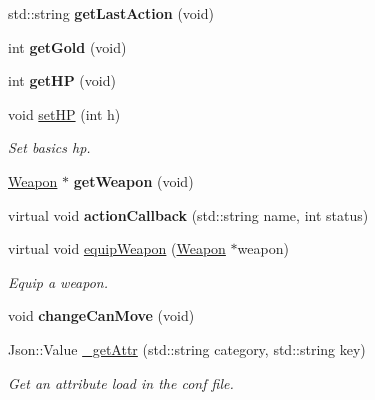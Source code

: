 \begin{DoxyCompactItemize}
\item 
\hypertarget{class_characters_a0df57bdee9ddc5e4e18954b8b30b1331}{std\+::string {\bfseries get\+Last\+Action} (void)}\label{class_characters_a0df57bdee9ddc5e4e18954b8b30b1331}

\item 
\hypertarget{class_characters_a76b0e62a2f7c10e71682196db0ee0056}{int {\bfseries get\+Gold} (void)}\label{class_characters_a76b0e62a2f7c10e71682196db0ee0056}

\item 
\hypertarget{class_characters_a136d6ba8b4bd401fda19b14b089a107f}{int {\bfseries get\+H\+P} (void)}\label{class_characters_a136d6ba8b4bd401fda19b14b089a107f}

\item 
void \hyperlink{class_characters_a63874c1b86156aa6c4c6a7c26afef6e7}{set\+H\+P} (int h)
\begin{DoxyCompactList}\small\item\em Set basics hp. \end{DoxyCompactList}\item 
\hypertarget{class_characters_aae885a7d773657cdf18f8dfced51d1a8}{\hyperlink{class_weapon}{Weapon} $\ast$ {\bfseries get\+Weapon} (void)}\label{class_characters_aae885a7d773657cdf18f8dfced51d1a8}

\item 
\hypertarget{class_characters_a76e565eca6d40dc04119697e1218d24d}{virtual void {\bfseries action\+Callback} (std\+::string name, int status)}\label{class_characters_a76e565eca6d40dc04119697e1218d24d}

\item 
virtual void \hyperlink{class_characters_a99ea3219f0784f29306bfe539301b83a}{equip\+Weapon} (\hyperlink{class_weapon}{Weapon} $\ast$weapon)
\begin{DoxyCompactList}\small\item\em Equip a weapon. \end{DoxyCompactList}\item 
\hypertarget{class_characters_a542fa5bfc689011ccc0c4cc4edc9d32a}{void {\bfseries change\+Can\+Move} (void)}\label{class_characters_a542fa5bfc689011ccc0c4cc4edc9d32a}

\item 
Json\+::\+Value \hyperlink{class_characters_ace37d9664457f555a0009eb5f3b8b6b2}{\+\_\+get\+Attr} (std\+::string category, std\+::string key)
\begin{DoxyCompactList}\small\item\em Get an attribute load in the conf file. \end{DoxyCompactList}\end{DoxyCompactItemize}
